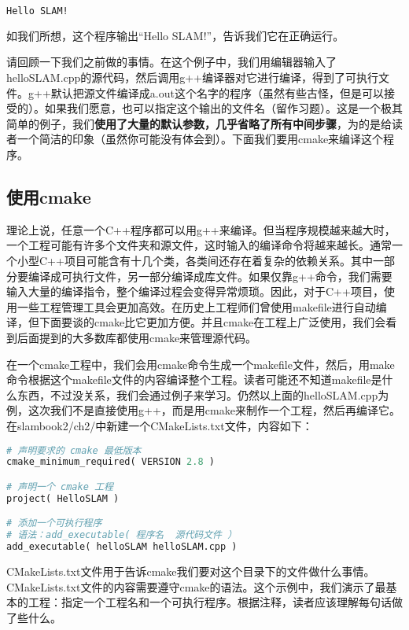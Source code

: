 \begin{lstlisting}[language=sh,caption=终端输入：]
% ./a.out
Hello SLAM!
\end{lstlisting}

如我们所想，这个程序输出“Hello SLAM!”，告诉我们它在正确运行。

请回顾一下我们之前做的事情。在这个例子中，我们用编辑器输入了helloSLAM.cpp的源代码，然后调用g++编译器对它进行编译，得到了可执行文件。g++默认把源文件编译成a.out这个名字的程序（虽然有些古怪，但是可以接受的）。如果我们愿意，也可以指定这个输出的文件名（留作习题）。这是一个极其简单的例子，我们\textbf{使用了大量的默认参数，几乎省略了所有中间步骤}，为的是给读者一个简洁的印象（虽然你可能没有体会到）。下面我们要用cmake来编译这个程序。

\subsection{使用cmake}
理论上说，任意一个C++程序都可以用g++来编译。但当程序规模越来越大时，一个工程可能有许多个文件夹和源文件，这时输入的编译命令将越来越长。通常一个小型C++项目可能含有十几个类，各类间还存在着复杂的依赖关系。其中一部分要编译成可执行文件，另一部分编译成库文件。如果仅靠g++命令，我们需要输入大量的编译指令，整个编译过程会变得异常烦琐。因此，对于C++项目，使用一些工程管理工具会更加高效。在历史上工程师们曾使用makefile进行自动编译，但下面要谈的cmake比它更加方便。并且cmake在工程上广泛使用，我们会看到后面提到的大多数库都使用cmake来管理源代码。

在一个cmake工程中，我们会用cmake命令生成一个makefile文件，然后，用make命令根据这个makefile文件的内容编译整个工程。读者可能还不知道makefile是什么东西，不过没关系，我们会通过例子来学习。仍然以上面的helloSLAM.cpp为例，这次我们不是直接使用g++，而是用cmake来制作一个工程，然后再编译它。在slambook2/ch2/中新建一个CMakeLists.txt文件，内容如下：

\begin{lstlisting}[language=Python,caption=slambook2/ch2/CMakeLists.txt]
# 声明要求的 cmake 最低版本
cmake_minimum_required( VERSION 2.8 )

# 声明一个 cmake 工程
project( HelloSLAM )

# 添加一个可执行程序
# 语法：add_executable( 程序名  源代码文件 ）
add_executable( helloSLAM helloSLAM.cpp )
\end{lstlisting}

CMakeLists.txt文件用于告诉cmake我们要对这个目录下的文件做什么事情。CMakeLists.txt文件的内容需要遵守cmake的语法。这个示例中，我们演示了最基本的工程：指定一个工程名和一个可执行程序。根据注释，读者应该理解每句话做了些什么。

